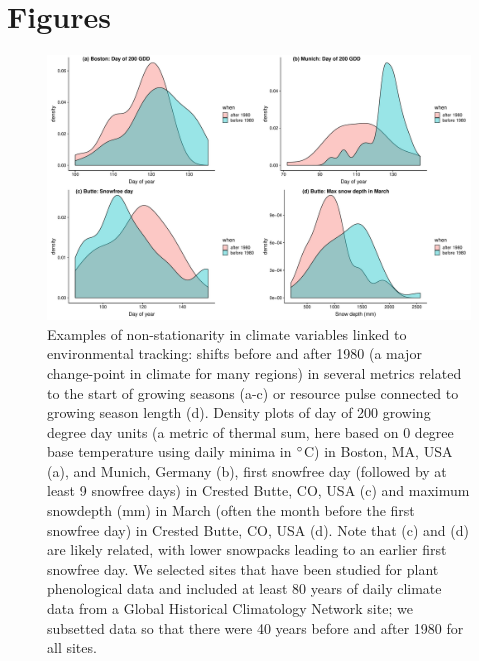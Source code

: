 \documentclass[11pt,letterpaper]{article}
\begin{document}
\clearpage
\section{Figures}

\begin{figure}[h!]
\centering
\includegraphics[width=1\textwidth]{..//..//..//R/graphs/otherdat/climdata.pdf}
\caption{Examples of non-stationarity in climate variables linked to environmental tracking: shifts before and after 1980 (a major change-point in climate for many regions) in several metrics related to the start of growing seasons (a-c) or resource pulse connected to growing season length (d). Density plots of day of 200 growing degree day units (a metric of thermal sum, here based on 0 degree base temperature using daily minima in $\degree$C) in Boston, MA, USA (a), and Munich, Germany (b), first snowfree day (followed by at least 9 snowfree days) in Crested Butte, CO, USA (c) and maximum snowdepth (mm) in March (often the month before the first snowfree day) in Crested Butte, CO, USA (d). Note that (c) and (d) are likely related, with lower snowpacks leading to an earlier first snowfree day. We selected sites that have been studied for plant phenological data and included at least 80 years of daily climate data from a Global Historical Climatology Network site; we subsetted data so that there were 40 years before and after 1980 for all sites.} %
 \label{fig:climdat}
\end{figure}
\end{document}
